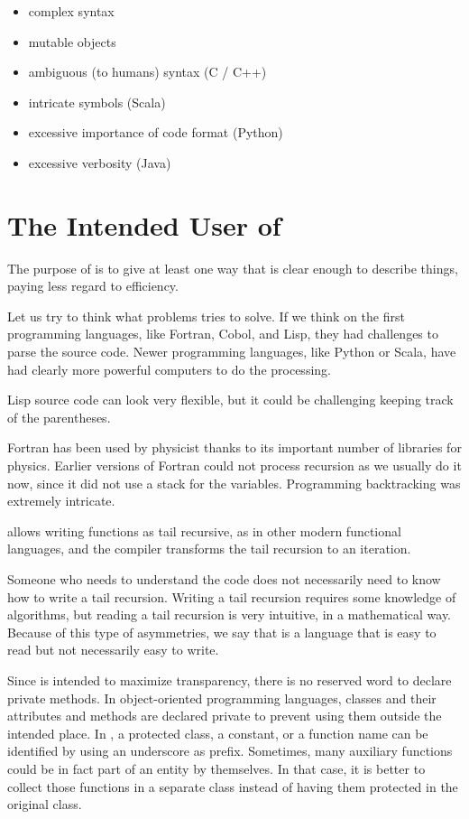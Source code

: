 \begin{itemize}
    \item complex syntax
    \item mutable objects
    \item ambiguous (to humans) syntax (C / C++)
    \item intricate symbols (Scala)
    \item excessive importance of code format (Python)
    \item excessive verbosity (Java)
\end{itemize}


\section{The Intended User of \Soda}

The purpose of \Soda is to give at least one way that is clear enough to describe things, paying less regard to efficiency.

Let us try to think what problems \Soda tries to solve.
If we think on the first programming languages, like Fortran, Cobol, and Lisp, they had challenges to parse the source code.
Newer programming languages, like Python or Scala, have had clearly more powerful computers to do the processing.

Lisp source code can look very flexible, but it could be challenging keeping track of the parentheses.

Fortran has been used by physicist thanks to its important number of libraries for physics.
Earlier versions of Fortran could not process recursion as we usually do it now, since it did not use a stack for the variables.
Programming backtracking was extremely intricate.

\Soda allows writing functions as tail recursive, as in other modern functional languages, and the compiler transforms the tail recursion to an iteration.

Someone who needs to understand the code does not necessarily need to know how to write a tail recursion.
Writing a tail recursion requires some knowledge of algorithms, but reading a tail recursion is very intuitive, in a mathematical way.
Because of this type of asymmetries, we say that \Soda is a language that is easy to read but not necessarily easy to write.

Since \Soda is intended to maximize transparency, there is no reserved word to declare private methods.
In object-oriented programming languages, classes and their attributes and methods are declared private to prevent using them outside the intended place.
In \Soda, a protected class, a constant, or a function name can be identified by using an underscore as prefix.
Sometimes, many auxiliary functions could be in fact part of an entity by themselves.
In that case, it is better to collect those functions in a separate class instead of having them protected in the original class.


